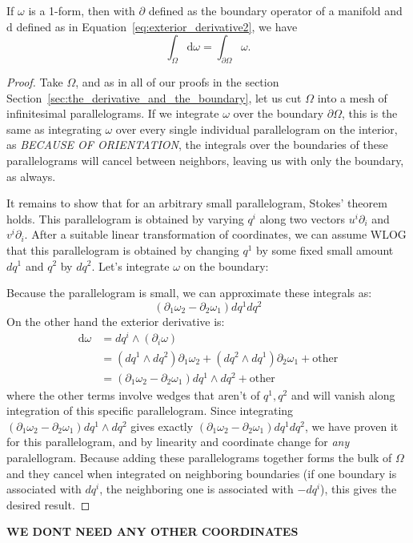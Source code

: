 	\begin{theorem}
		If $\omega$ is a 1-form, then with $\partial$ defined as the boundary operator of a manifold and $\mathrm d$ defined as in Equation~\eqref{eq:exterior_derivative2}, we have
		\begin{equation*} 
			\int_\Omega \mathrm d \omega = \int_{\partial \Omega} \omega.
		\end{equation*}
	\end{theorem}
	\begin{proof}
		Take $\Omega$, and as in all of our proofs in the section Section~\ref{sec:the_derivative_and_the_boundary}, let us cut $\Omega$ into a mesh of infinitesimal parallelograms. If we integrate $\omega$ over the boundary $\partial \Omega$, this is the same as integrating $\omega$ over every single individual parallelogram on the interior, as \emph{BECAUSE OF ORIENTATION}, the integrals over the boundaries of these parallelograms will cancel between neighbors, leaving us with only the boundary, as always.
		
		It remains to show that for an arbitrary small parallelogram, Stokes' theorem holds. This parallelogram is obtained by varying $q^i$ along two vectors $u^i \partial_i$ and $v^i \partial_i$. After a suitable linear transformation of coordinates, we can assume WLOG that this parallelogram is obtained by changing $q^1$ by some fixed small amount $dq^1$ and $q^2$ by $dq^2$. Let's integrate $\omega$ on the boundary:
		
		Because the parallelogram is small, we can approximate these integrals as:
		\begin{equation*}
			(\partial_1 \omega_2 - \partial_2 \omega_1) dq^1 dq^2
		\end{equation*}
		On the other hand the exterior derivative is:
		\begin{align*}
			\mathrm d \omega 
			&= dq^i \wedge (\partial_i \omega) \\
			&= (dq^1 \wedge dq^2) \partial_1 \omega_2 + (dq^2 \wedge dq^1)  \partial_2 \omega_1 + \text{other} \\
			&= (\partial_1 \omega_2 - \partial_2 \omega_1) dq^1 \wedge dq^2 + \text{other}
		\end{align*}
		where the other terms involve wedges that aren't of $q^1,q^2$ and will vanish along integration of this specific parallelogram. Since integrating $(\partial_1 \omega_2 - \partial_2 \omega_1) dq^1 \wedge dq^2$ gives exactly $(\partial_1 \omega_2 - \partial_2 \omega_1) dq^1 dq^2$, we have proven it for this parallelogram, and by linearity and coordinate change for \emph{any} paralellogram. Because adding these parallelograms together forms the bulk of $\Omega$ and they cancel when integrated on neighboring boundaries (if one boundary is associated with $dq^i$, the neighboring one is associated with $-dq^i$), this gives the desired result. 
	\end{proof}
	\textbf{WE DONT NEED ANY OTHER COORDINATES}
	
